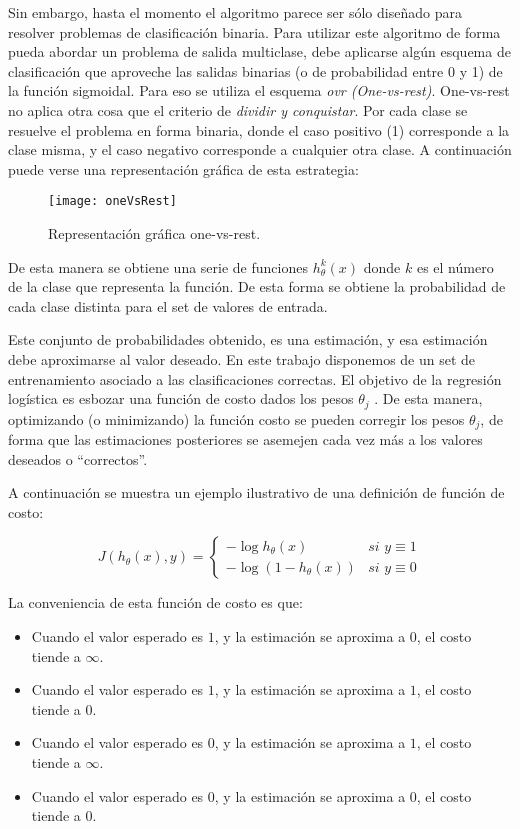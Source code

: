 Sin embargo, hasta el momento el algoritmo parece ser sólo diseñado para resolver problemas de clasificación binaria. Para utilizar este algoritmo de forma pueda abordar un problema de salida multiclase, debe aplicarse algún esquema de clasificación que aproveche las salidas binarias (o de probabilidad entre 0 y 1) de la función sigmoidal. Para eso se utiliza el esquema \textit{ovr (One-vs-rest)}. One-vs-rest no aplica otra cosa que el criterio de \textit{dividir y conquistar}. Por cada clase se resuelve el problema en forma binaria, donde el caso positivo (1) corresponde a la clase misma, y el caso negativo corresponde a cualquier otra clase. A continuación puede verse una representación gráfica de esta estrategia:

\begin{figure}[H]
\centering
\texttt{[image: oneVsRest]}
\caption{Representación gráfica one-vs-rest. \cite{AndrewNgMulticlass}}
\label{fig:oneVsRest}
\end{figure}

De esta manera se obtiene una serie de funciones $h_{\theta}^k(x)$ donde $k$ es el número de la clase que representa la función. De esta forma se obtiene la probabilidad de cada clase distinta para el set de valores de entrada.

Este conjunto de probabilidades obtenido, es una estimación, y esa estimación debe aproximarse al valor deseado. En este trabajo disponemos de un set de entrenamiento asociado a las clasificaciones correctas. El objetivo de la regresión logística es esbozar una función de costo dados los pesos $\theta_{j}$ . De esta manera, optimizando (o minimizando) la función costo se pueden corregir los pesos $\theta_{j}$, de forma que las estimaciones posteriores se asemejen cada vez más a los valores deseados o ``correctos''. 

A continuación se muestra un ejemplo ilustrativo de una definición de función de costo:

\begin{equation}
J(h_{\theta }(x),y) = \begin{cases} 
- \log h_{\theta}(x) & \textit{si $y \equiv 1$} \\
- \log (1- h_{\theta}(x)) & \textit{si $y \equiv 0$}
\end{cases}
\end{equation}

La conveniencia de esta función de costo es que:

\begin{itemize}
  \item Cuando el valor esperado es $1$, y la estimación se aproxima a $0$, el costo tiende a $\infty$. 
  \item Cuando el valor esperado es $1$, y la estimación se aproxima a $1$, el costo tiende a $0$.
  \item Cuando el valor esperado es $0$, y la estimación se aproxima a $1$, el costo tiende a $\infty$.
  \item Cuando el valor esperado es $0$, y la estimación se aproxima a $0$, el costo tiende a $0$.
\end{itemize}

